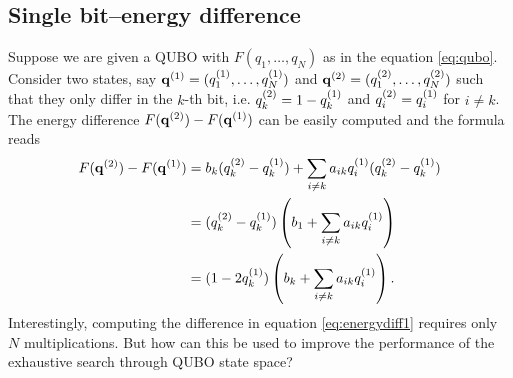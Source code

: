\subsection{Single bit--energy difference}
Suppose we are given a QUBO with $F(q_{1},\ldots,q_{N})$ as in the equation
\ref{eq:qubo}. Consider two states, say $\mathbf{q}^{(1)} = (q^{(1)}_{1},\ldots,q^{(1)}_{N})$
and $\mathbf{q}^{(2)}=(q^{(2)}_{1},\ldots,q^{(2)}_{N})$ such that they only differ in the
$k$-th bit, i.e. $q^{(2)}_{k}=1-q^{(1)}_{k}$ and $q^{(2)}_{i}=q^{(1)}_{i}$ for $i \ne
  k$. The energy difference $F(\mathbf{q}^{(2)})-F(\mathbf{q}^{(1)})$ can be easily computed and the
formula reads
\begin{align}
  \begin{split}
    \label{eq:energydiff1}
    F(\mathbf{q}^{(2)})-F(\mathbf{q}^{(1)}) &= b_{k}(q^{(2)}_{k}-q^{(1)}_{k}) + \sum_{i\ne k}a_{ik}q^{(1)}_{i}(q^{(2)}_{k} - q^{(1)}_{k}) \\
    &= (q^{(2)}_{k}-q^{(1)}_{k}) \left(b_{1} + \sum_{i \ne k}a_{ik}q^{(1)}_{i}\right) \\
    & = (1-2q^{(1)}_{k}) \left(b_{k} + \sum_{i \ne k}a_{ik}q^{(1)}_{i}\right).
  \end{split}
\end{align}
Interestingly, computing the difference in equation \eqref{eq:energydiff1}
requires only $N$ multiplications. But how can this be used to improve the
performance of the exhaustive search through QUBO state space?

